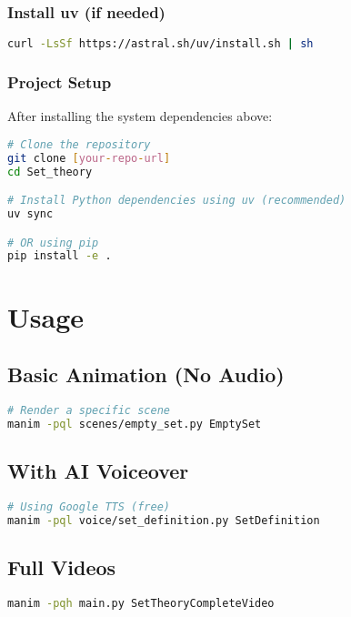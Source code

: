 \documentclass[12pt,a4paper]{article}
\begin{document}
\subsubsection{Install uv (if needed)}
\begin{lstlisting}[language=bash]
curl -LsSf https://astral.sh/uv/install.sh | sh
\end{lstlisting}

\subsubsection{Project Setup}
After installing the system dependencies above:

\begin{lstlisting}[language=bash]
# Clone the repository
git clone [your-repo-url]
cd Set_theory

# Install Python dependencies using uv (recommended)
uv sync

# OR using pip
pip install -e .
\end{lstlisting}

\section{Usage}

\subsection{Basic Animation (No Audio)}
\begin{lstlisting}[language=bash]
# Render a specific scene
manim -pql scenes/empty_set.py EmptySet
\end{lstlisting}

\subsection{With AI Voiceover}
\begin{lstlisting}[language=bash]
# Using Google TTS (free)
manim -pql voice/set_definition.py SetDefinition
\end{lstlisting}

\subsection{Full Videos}
\begin{lstlisting}[language=bash]
manim -pqh main.py SetTheoryCompleteVideo
\end{lstlisting}
\end{document}
